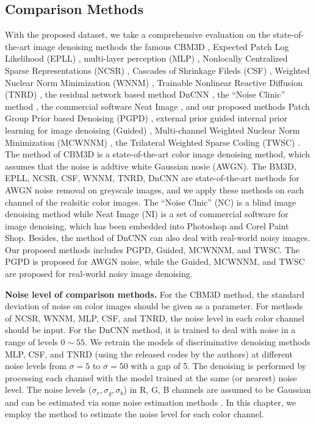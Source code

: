 \subsection{Comparison Methods}

With the proposed dataset, we take a comprehensive evaluation on the state-of-the-art image denoising methods the famous CBM3D \cite{cbm3d}, Expected Patch Log Likelihood (EPLL) \cite{epll}, multi-layer perception (MLP) \cite{mlp}, Nonlocally Centralized Sparse Representations (NCSR) \cite{ncsr}, Cascades of Shrinkage Fileds (CSF) \cite{csf}, Weighted Nuclear Norm Minimization (WNNM) \cite{wnnm}, Trainable Nonlinear Reactive Diffusion (TNRD) \cite{tnrd}, the residual network based method DnCNN \cite{dncnn}, the ``Noise Clinic'' method \cite{noiseclinic,ncwebsite}, the commercial software Neat Image \cite{neatimage}, and our proposed methods Patch Group Prior based Denoising (PGPD) \cite{pgpd}, external prior guided internal prior learning for image denoising (Guided) \cite{guided}, Multi-channel Weighted Nuclear Norm Minimization (MCWNNM) \cite{mcwnnm}, the Trilateral Weighted Sparse Coding (TWSC) \cite{twsc}. The method of CBM3D is a state-of-the-art color image denoising method, which assumes that the noise is addtive white Gaussian nosie (AWGN). The BM3D, EPLL, NCSR, CSF, WNNM, TNRD, DnCNN are state-of-the-art methods for AWGN noise removal on greyscale images, and we apply these methods on each channel of the realsitic color images.  The ``Noise Clnic'' (NC) is a blind image denoising method while Neat Image (NI) is a set of commercial software for image denoising, which has been embedded into Photoshop and Corel Paint Shop. Besides, the method of DnCNN \cite{dncnn} can also deal with real-world noisy images. Our proposed methods includes PGPD, Guided, MCWNNM, and TWSC. The PGPD is proposed for AWGN noise, while the Guided, MCWNNM, and TWSC are proposed for real-world noisy image denoising.

\textbf{Noise level of comparison methods.} For the CBM3D method, the standard deviation of noise on color images should be given as a parameter. For methods of NCSR,  WNNM, MLP, CSF, and TNRD, the noise level in each color channel should be input. For the DnCNN method, it is trained to deal with noise in a range of levels $0\sim55$. We retrain the models of discriminative denoising methods MLP, CSF, and TNRD (using the released codes by the authors) at different noise levels from $\sigma=5$ to $\sigma=50$ with a gap of 5. The denoising is performed by processing each channel with the model trained at the same (or nearest) noise level. The noise levels ($\sigma_{r}, \sigma_{g}, \sigma_{b}$) in R, G, B channels are assumed to be Gaussian and can be estimated via some noise estimation methods \cite{noiselevel,Chen2015ICCV}. In this chapter, we employ the method \cite{noiselevel} to estimate the noise level for each color channel.


